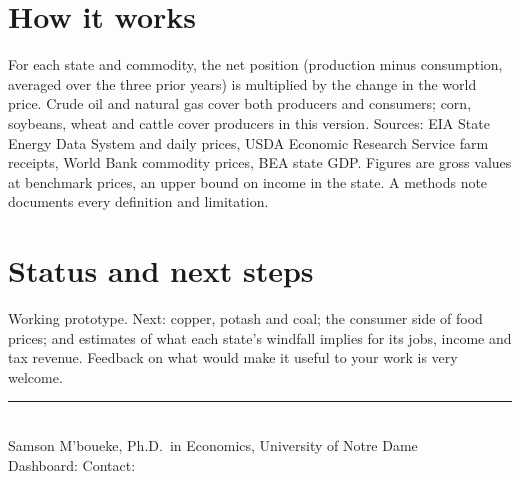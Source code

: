 \documentclass[10pt]{article}
\begin{document}
\section{How it works}
For each state and commodity, the net position (production minus consumption, averaged
over the three prior years) is multiplied by the change in the world price. Crude oil and
natural gas cover both producers and consumers; corn, soybeans, wheat and cattle cover
producers in this version. Sources: EIA State Energy Data System and daily prices, USDA
Economic Research Service farm receipts, World Bank commodity prices, BEA state GDP.
Figures are gross values at benchmark prices, an upper bound on income in the state.
A methods note documents every definition and limitation.

\section{Status and next steps}
Working prototype. Next: copper, potash and coal; the consumer side of food prices; and
estimates of what each state's windfall implies for its jobs, income and tax revenue.
Feedback on what would make it useful to your work is very welcome.

\vfill
\rule{\textwidth}{0.4pt}\\
{\small Samson M'boueke, Ph.D.\ in Economics, University of Notre Dame\\
Dashboard:  \qquad Contact: }
\end{document}
